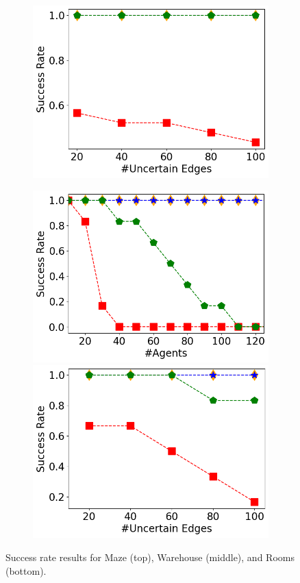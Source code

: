 \documentclass[letterpaper]{article} %
\def\
UrlFont{\rm}  %
\theoremstyle{definition}
\begin{document}
\begin{figure}[tbh]
\begin{subfigure}[b]{\columnwidth}
      \includegraphics[width=0.47\columnwidth]{Figures/warehouse/mixed_small_figures/Success-Rate(UEs)_k=40_ID_ONLY.png}
    \end{subfigure}
    \begin{subfigure}[b]{\columnwidth}\centering  
      \includegraphics[width=0.47\columnwidth]{Figures/room/mixed_small_figures/Success-Rate(k)_pos=100_ID_ONLY.png}
      \includegraphics[width=0.47\columnwidth]{Figures/room/mixed_small_figures/Success-Rate(UEs)_k=30_ID_ONLY.png}
    \end{subfigure}
    \caption{Success rate results for Maze (top), Warehouse (middle), and Rooms (bottom).}
    \label{fig:success-rate}
\end{figure}
\end{document}
